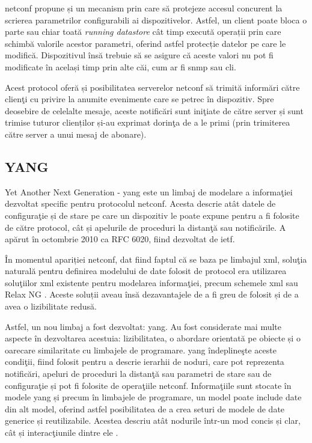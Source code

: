 \gls{netconf} propune și un mecanism prin care să protejeze accesul concurent la scrierea parametrilor configurabili ai dispozitivelor. Astfel, un client poate bloca o parte sau chiar toată \textit{running datastore} cât timp execută operații prin care schimbă valorile acestor parametri, oferind astfel protecție datelor pe care le modifică. Dispozitivul însă trebuie să se asigure că aceste valori nu pot fi modificate în același timp prin alte căi, cum ar fi \gls{snmp} sau \gls{cli}.

Acest protocol oferă și posibilitatea serverelor \gls{netconf} să trimită informări către clienţi cu privire la anumite evenimente care se petrec în dispozitiv. Spre deosebire de celelalte mesaje, aceste notificări sunt iniţiate de către server și sunt trimise tuturor clienților și-au exprimat dorinţa de a le primi (prin trimiterea către server a unui mesaj de abonare). 

\subsection{YANG} 

Yet Another Next Generation - \gls{yang} este un limbaj de modelare a informaţiei dezvoltat specific pentru protocolul \gls{netconf}. Acesta descrie atât datele de configuraţie și de stare pe care un dispozitiv le poate expune pentru a fi folosite de către protocol, cât și apelurile de proceduri la distanţă sau notificările. A apărut în octombrie 2010 ca RFC 6020, fiind dezvoltat de \gls{ietf}.

În momentul apariției \gls{netconf}, dat fiind faptul că se baza pe limbajul \gls{xml}, soluţia naturală pentru definirea modelului de date folosit de protocol era utilizarea soluţiilor \gls{xml} existente pentru modelarea informaţiei, precum schemele \gls{xml} sau Relax NG \cite{ji2009challenges}. Aceste soluții aveau însă dezavantajele de a fi greu de folosit și de a avea o lizibilitate redusă.

Astfel, un nou limbaj a fost dezvoltat: \gls{yang}. Au fost considerate mai multe aspecte în dezvoltarea acestuia: lizibilitatea, o abordare orientată pe obiecte și o oarecare similaritate cu limbajele de programare. \gls{yang} îndeplineşte aceste condiţii, fiind folosit pentru a descrie ierarhii de noduri, care pot reprezenta notificări, apeluri de proceduri la distanţă sau parametri de stare sau de configuraţie și pot fi folosite de operaţiile \gls{netconf}. Informaţiile sunt stocate în modele \gls{yang} și precum în limbajele de programare, un model poate include date din alt model, oferind astfel posibilitatea de a crea seturi de modele de date generice și reutilizabile\cite{nataf2010end}. Acestea descriu atât nodurile într-un mod concis și clar, cât și interacţiunile dintre ele \cite{cui2009contrast}.

